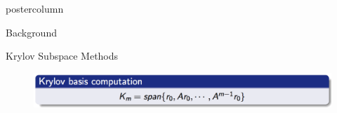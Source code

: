 \documentclass{beamer}
\begin{document}
\begin{frame}
\begin{columns}
\begin{column}{.33\textwidth}
\begin{beamercolorbox}[center]{postercolumn}
\begin{minipage}{.98\textwidth}
{\begin{myblock}{Background}
\begin{itemize}
\begin{itemize}
						\end{itemize}
						\end{itemize}
						\vspace{0.4em}
					\end{myblock}
					\begin{myblock}{Krylov Subspace Methods}
					\vspace{0.4em}
					\begin{figure}
							\begin{minipage}{.72\textwidth}
								\centering\includegraphics[width=\textwidth]{img/krylov.png}
							\end{minipage}
					\end{figure}
            			\vspace{0.5em}


\end{myblock}}
\end{minipage}
\end{beamercolorbox}
\end{column}
\end{columns}
\end{frame}
\end{document}
